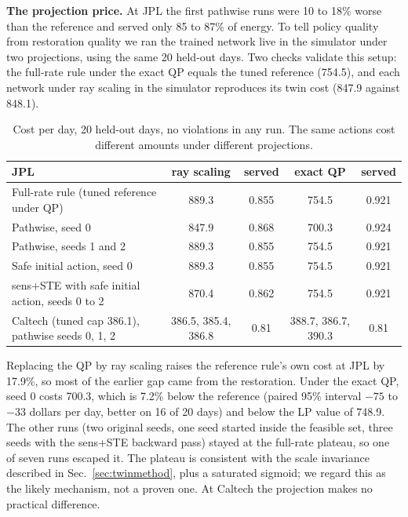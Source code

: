 \documentclass[11pt]{article}
\begin{document}
\textbf{The projection price.}\label{sec:pp} At JPL the first pathwise runs were 10 to 18\% worse than the reference and served only 85 to 87\% of energy. To tell policy quality from restoration quality we ran the trained network live in the simulator under two projections, using the same 20 held-out days. Two checks validate this setup: the full-rate rule under the exact QP equals the tuned reference (754.5), and each network under ray scaling in the simulator reproduces its twin cost (847.9 against 848.1).
\begin{table}[h]\centering\small
\begin{tabular}{@{}L{5.4cm}cccc@{}}\toprule JPL & ray scaling & served & exact QP & served\\\midrule
Full-rate rule (tuned reference under QP) & 889.3 & 0.855 & 754.5 & 0.921\\
Pathwise, seed 0 & 847.9 & 0.868 & 700.3 & 0.924\\
Pathwise, seeds 1 and 2 & 889.3 & 0.855 & 754.5 & 0.921\\
Safe initial action, seed 0 & 889.3 & 0.855 & 754.5 & 0.921\\
sens+STE with safe initial action, seeds 0 to 2 & 870.4 & 0.862 & 754.5 & 0.921\\\midrule
Caltech (tuned cap 386.1), pathwise seeds 0, 1, 2 & 386.5, 385.4, 386.8 & 0.81 & 388.7, 386.7, 390.3 & 0.81\\\bottomrule
\end{tabular}\caption{Cost per day, 20 held-out days, no violations in any run. The same actions cost different amounts under different projections.}\label{tab:pp}\end{table}
Replacing the QP by ray scaling raises the reference rule's own cost at JPL by 17.9\%, so most of the earlier gap came from the restoration. Under the exact QP, seed 0 costs 700.3, which is 7.2\% below the reference (paired 95\% interval $-75$ to $-33$ dollars per day, better on 16 of 20 days) and below the LP value of 748.9. The other runs (two original seeds, one seed started inside the feasible set, three seeds with the sens+STE backward pass) stayed at the full-rate plateau, so one of seven runs escaped it. The plateau is consistent with the scale invariance described in Sec.~\ref{sec:twinmethod}, plus a saturated sigmoid; we regard this as the likely mechanism, not a proven one. At Caltech the projection makes no practical difference.
\end{document}
